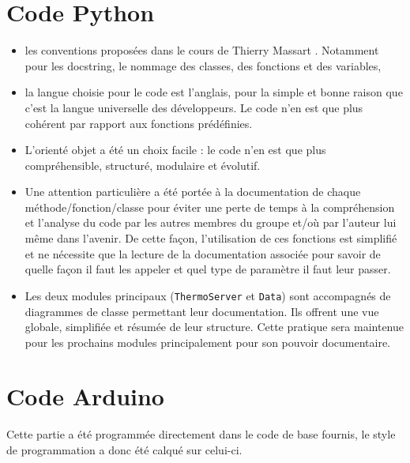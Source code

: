 \documentclass[11pt,a4paper,11pt]{report}
\begin{document}
\section{Code Python}
\begin{itemize}
\item les conventions proposées dans le cours de Thierry Massart \cite{massart}. Notamment pour les docstring, le nommage des classes, des fonctions et des variables,
\item la langue choisie pour le code est l'anglais, pour la simple et bonne raison que c'est la langue universelle des développeurs. Le code n'en est que plus cohérent par rapport aux fonctions prédéfinies.
\item L'orienté objet a été un choix facile : le code n'en est que plus compréhensible, structuré, modulaire et évolutif. 
\item Une attention particulière a été portée à la documentation de chaque méthode/fonction/classe pour éviter une perte de temps à la compréhension et l'analyse du code par les autres membres du groupe et/où par l'auteur lui même dans l'avenir. De cette façon, l'utilisation de ces fonctions est simplifié et ne nécessite que la lecture de la documentation associée pour savoir de quelle façon il faut les appeler et quel type de paramètre il faut leur passer.
\item Les deux modules principaux (\texttt{ThermoServer} et \texttt{Data}) sont accompagnés de diagrammes de classe permettant leur documentation. Ils offrent une vue globale, simplifiée et résumée de leur structure. Cette pratique sera maintenue pour les prochains modules principalement pour son pouvoir documentaire.
\end{itemize}

\section{Code Arduino}

Cette partie a été programmée directement dans le code de base fournis, le style de programmation a donc été calqué sur celui-ci.



\newpage

\nocite{int1}
\nocite{int2}
\nocite{int4}
\nocite{int5}
\nocite{int6}
\nocite{int7}
\nocite{int8}
\nocite{ar1}
\nocite{ar2}
\nocite{ar3}
\nocite{ar4}
\nocite{wil1}
\nocite{wil2}
\nocite{wil3}
\nocite{wil4}
\nocite{wil5}
\nocite{s1}
\nocite{s2}
\nocite{pid1}
\nocite{pid2}
\nocite{pid4}
\nocite{pid5}
\nocite{pid6}
\nocite{pid7}
\nocite{ananum}


 
\end{document}
